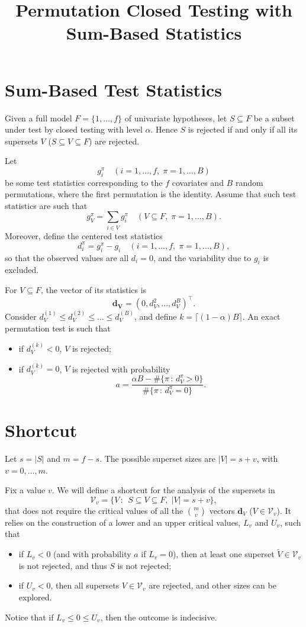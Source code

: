 \documentclass[11pt,a4paper,openright,twoside]{article}
\title{Permutation Closed Testing with Sum-Based Statistics}
\author{}
\date{}
\begin{document}
\maketitle


\section{Sum-Based Test Statistics}
Given a full model $F=\{1,\ldots, f\}$ of univariate hypotheses, let $S\subseteq F$ be a subset under test by closed testing with level $\alpha$. Hence $S$ is rejected if and only if all its supersets $V$ ($S\subseteq V\subseteq F$) are rejected.

Let
\[g_i^\pi\quad (i=1,\ldots,f,\; \pi=1,\ldots,B)\]
be some test statistics corresponding to the $f$ covariates and $B$ random permutations, where the first permutation is the identity. Assume that such test statistics are such that
\[g_V^\pi=\sum_{i\in V}g_i^\pi\quad (V\subseteq F,\;\pi=1,\ldots,B).\]
Moreover, define the centered test statistics
\[d_i^\pi = g_i^\pi - g_i \quad (i=1,\ldots,f,\; \pi=1,\ldots,B),\]
so that the observed values are all $d_i=0$, and the variability due to $g_i$ is excluded.

For $V\subseteq F$, the vector of its statistics is
\[\mathbf{d_V}=(0,d_V^2,\ldots,d_V^B)^\top.\]
Consider $d_V^{(1)}\leq d_V^{(2)}\leq\ldots\leq d_V^{(B)}$, and define $k=\lceil (1-\alpha) B\rceil$. An exact permutation test is such that
\begin{itemize}
\item if $d_V^{(k)}<0$, $V$ is rejected;
\item if $d_V^{(k)}=0$, $V$ is rejected with probability
\[a=\frac{\alpha B - \#\{\pi\,:\,d_V^\pi>0\}}{\#\{\pi\,:\,d_V^\pi=0\}}.\]
\end{itemize}







\vspace{10mm}

\section{Shortcut}
Let $s=|S|$ and $m=f-s$. The possible superset sizes are $|V|=s+v$, with $v=0,\ldots,m$.

Fix a value $v$. We will define a shortcut for the analysis of the supersets in
\[\mathcal{V}_v=\{V\,:\,\;S\subseteq V\subseteq F,\; |V|=s+v\},\]
that does not require the critical values of all the $\binom{m}{v}$ vectors $\mathbf{d}_V$ ($V\in\mathcal{V}_v$). It relies on the construction of a lower and an upper critical values, $L_v$ and $U_v$, such that
\begin{itemize}
\item if $L_v< 0$ (and with probability $a$ if $L_v=0$), then at least one superset $\tilde{V}\in\mathcal{V}_v$ is not rejected, and thus $S$ is not rejected;
\item if $U_v<0$, then all supersets $V\in\mathcal{V}_v$ are rejected, and other sizes can be explored.
\end{itemize}
Notice that if $L_v\leq 0\leq U_v$, then the outcome is indecisive. 
\end{document}
